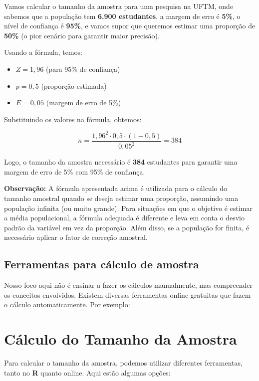 \documentclass[
]{book}
\providecommand{\tightlist}{%
  \setlength{\itemsep}{0pt}\setlength{\parskip}{0pt}}
\begin{document}
Vamos calcular o tamanho da amostra para uma pesquisa na UFTM, onde sabemos que a população tem \textbf{6.900 estudantes}, a margem de erro é \textbf{5\%}, o nível de confiança é \textbf{95\%}, e vamos supor que queremos estimar uma proporção de \textbf{50\%} (o pior cenário para garantir maior precisão).

Usando a fórmula, temos:

\begin{itemize}
\tightlist
\item
  \(Z = 1,96\) (para 95\% de confiança)
\item
  \(p = 0,5\) (proporção estimada)
\item
  \(E = 0,05\) (margem de erro de 5\%)
\end{itemize}

Substituindo os valores na fórmula, obtemos:

\[
n = \frac{{1,96^2 \cdot 0,5 \cdot (1 - 0,5)}}{{0,05^2}} = 384
\]

Logo, o tamanho da amostra necessário é \textbf{384} estudantes para garantir uma margem de erro de 5\% com 95\% de confiança.

\textbf{Observação:} A fórmula apresentada acima é utilizada para o cálculo do tamanho amostral quando se deseja estimar uma proporção, assumindo uma população infinita (ou muito grande). Para situações em que o objetivo é estimar a média populacional, a fórmula adequada é diferente e leva em conta o desvio padrão da variável em vez da proporção. Além disso, se a população for finita, é necessário aplicar o fator de correção amostral.

\subsection{Ferramentas para cálculo de amostra}\label{ferramentas-para-cuxe1lculo-de-amostra}

Nosso foco aqui não é ensinar a fazer os cálculos manualmente, mas compreender os conceitos envolvidos. Existem diversas ferramentas online gratuitas que fazem o cálculo automaticamente. Por exemplo:

\section{Cálculo do Tamanho da Amostra}\label{cuxe1lculo-do-tamanho-da-amostra}

Para calcular o tamanho da amostra, podemos utilizar diferentes ferramentas, tanto no \textbf{R} quanto online. Aqui estão algumas opções:
\end{document}
